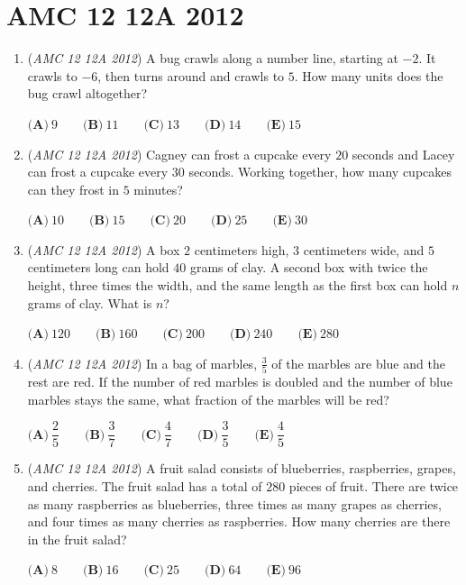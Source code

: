 \section{AMC 12 12A 2012}
        \begin{enumerate}
        	\item (\textit{AMC 12 12A 2012}) A bug crawls along a number line, starting at $-2$. It crawls to $-6$, then turns around and crawls to $5$. How many units does the bug crawl altogether?


 $\textbf{(A)}\ 9\qquad\textbf{(B)}\ 11\qquad\textbf{(C)}\ 13\qquad\textbf{(D)}\ 14\qquad\textbf{(E)}\ 15$


	\item (\textit{AMC 12 12A 2012}) Cagney can frost a cupcake every $20$ seconds and Lacey can frost a cupcake every $30$ seconds. Working together, how many cupcakes can they frost in $5$ minutes?


 $\textbf{(A)}\ 10\qquad\textbf{(B)}\ 15\qquad\textbf{(C)}\ 20\qquad\textbf{(D)}\ 25\qquad\textbf{(E)}\ 30$


	\item (\textit{AMC 12 12A 2012}) A box $2$ centimeters high, $3$ centimeters wide, and $5$ centimeters long can hold $40$ grams of clay.  A second box with twice the height, three times the width, and the same length as the first box can hold $n$ grams of clay.  What is $n$?


 $\textbf{(A)}\ 120\qquad\textbf{(B)}\ 160\qquad\textbf{(C)}\ 200\qquad\textbf{(D)}\ 240\qquad\textbf{(E)}\ 280$


	\item (\textit{AMC 12 12A 2012}) In a bag of marbles, $\frac{3}{5}$ of the marbles are blue and the rest are red.  If the number of red marbles is doubled and the number of blue marbles stays the same, what fraction of the marbles will be red?


 $\textbf{(A)}\ \dfrac{2}{5} \qquad\textbf{(B)}\ \dfrac{3}{7} \qquad\textbf{(C)}\ \dfrac{4}{7} \qquad\textbf{(D)}\ \dfrac{3}{5} \qquad\textbf{(E)}\ \dfrac{4}{5}$


	\item (\textit{AMC 12 12A 2012}) A fruit salad consists of blueberries, raspberries, grapes, and cherries.  The fruit salad has a total of $280$ pieces of fruit.  There are twice as many raspberries as blueberries, three times as many grapes as cherries, and four times as many cherries as raspberries.  How many cherries are there in the fruit salad?


 $\textbf{(A)}\ 8\qquad\textbf{(B)}\ 16\qquad\textbf{(C)}\ 25\qquad\textbf{(D)}\ 64\qquad\textbf{(E)}\ 96$



\end{enumerate}
